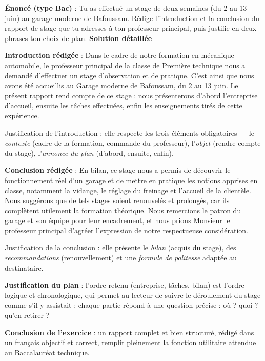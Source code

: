 \documentclass[11pt]{article}
\begin{document}
\begin{exoresolu}
\textbf{Énoncé (type Bac)} : Tu as effectué un stage de deux semaines (du 2 au 13 juin) au garage moderne de Bafoussam. Rédige l'introduction et la conclusion du rapport de stage que tu adresses à ton professeur principal, puis justifie en deux phrases ton choix de plan.
\tcblower
\textbf{Solution détaillée}

\textbf{Introduction rédigée} : \og Dans le cadre de notre formation en mécanique automobile, le professeur principal de la classe de Première technique nous a demandé d'effectuer un stage d'observation et de pratique. C'est ainsi que nous avons été accueillis au Garage moderne de Bafoussam, du 2 au 13 juin. Le présent rapport rend compte de ce stage : nous présenterons d'abord l'entreprise d'accueil, ensuite les tâches effectuées, enfin les enseignements tirés de cette expérience. \fg{}

Justification de l'introduction : elle respecte les trois éléments obligatoires — le \emph{contexte} (cadre de la formation, commande du professeur), l'\emph{objet} (rendre compte du stage), l'\emph{annonce du plan} (d'abord, ensuite, enfin).

\textbf{Conclusion rédigée} : \og En bilan, ce stage nous a permis de découvrir le fonctionnement réel d'un garage et de mettre en pratique les notions apprises en classe, notamment la vidange, le réglage du freinage et l'accueil de la clientèle. Nous suggérons que de tels stages soient renouvelés et prolongés, car ils complètent utilement la formation théorique. Nous remercions le patron du garage et son équipe pour leur encadrement, et nous prions Monsieur le professeur principal d'agréer l'expression de notre respectueuse considération. \fg{}

Justification de la conclusion : elle présente le \emph{bilan} (acquis du stage), des \emph{recommandations} (renouvellement) et une \emph{formule de politesse} adaptée au destinataire.

\textbf{Justification du plan} : l'ordre retenu (entreprise, tâches, bilan) est l'ordre logique et chronologique, qui permet au lecteur de suivre le déroulement du stage comme s'il y assistait ; chaque partie répond à une question précise : où ? quoi ? qu'en retirer ?

\textbf{Conclusion de l'exercice} : un rapport complet et bien structuré, rédigé dans un français objectif et correct, remplit pleinement la fonction utilitaire attendue au Baccalauréat technique.
\end{exoresolu}
\end{document}
